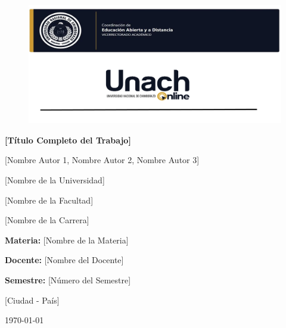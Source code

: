 \documentclass[12pt, letterpaper]{article}
\newcommand{\titulo}{[Título Completo del Trabajo]}
\newcommand{\autores}{[Nombre Autor 1, Nombre Autor 2, Nombre Autor 3]}
\newcommand{\afiliacion}{[Nombre de la Universidad]}
\newcommand{\facultad}{[Nombre de la Facultad]}
\newcommand{\carrera}{[Nombre de la Carrera]}
\newcommand{\materia}{[Nombre de la Materia]}
\newcommand{\docente}{[Nombre del Docente]}
\newcommand{\semestre}{[Número del Semestre]}
\newcommand{\ciudad}{[Ciudad - País]}
\begin{document}
\begin{titlepage}
    \thispagestyle{fancy}
    \fancyhf{}
    \fancyhead[R]{\thepage}

    \centering

    \vspace{0.5cm}
    \begin{figure}[H]
        \centering
        \includegraphics[width=1\linewidth]{../Graficos/Imagen1.png}
    \end{figure}

    {\Large\bfseries \titulo \par}

    \vspace{2cm}

    {\large \autores \par}

    \vspace{0.5cm}

    {\large \afiliacion \par}
    {\normalsize \facultad \par}
    {\normalsize \carrera \par}

    \vspace{1cm}

    {\normalsize \textbf{Materia:} \materia \par}
    {\normalsize \textbf{Docente:} \docente \par}
    {\normalsize \textbf{Semestre:} \semestre \par}

    \vfill

    {\normalsize \ciudad \par}
    {\normalsize \today \par}
\end{titlepage}
\end{document}
